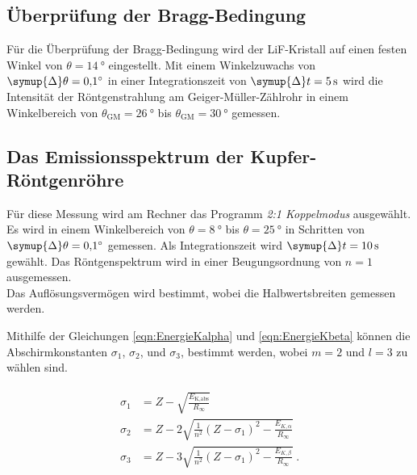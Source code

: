 \subsection{Überprüfung der Bragg-Bedingung}

    Für die Überprüfung der Bragg-Bedingung wird der LiF-Kristall auf einen festen Winkel von $\theta = \SI{14}{\degree}$ eingestellt.
    Mit einem Winkelzuwachs von $\symup{\Delta}\theta = \SI{0.1}{\degree}$ in einer Integrationszeit von $\symup{\Delta}t = \SI{5}{\second}$
    wird die Intensität der Röntgenstrahlung am Geiger-Müller-Zählrohr in einem Winkelbereich von $\theta_\text{GM} = \SI{26}{\degree}$
    bis $\theta_\text{GM} = \SI{30}{\degree}$ gemessen.


\subsection{Das Emissionsspektrum der Kupfer-Röntgenröhre}

    Für diese Messung wird am Rechner das Programm \textit{2:1 Koppelmodus} ausgewählt.
    Es wird in einem Winkelbereich von $\theta = \SI{8}{\degree}$ bis $\theta = \SI{25}{\degree}$ in Schritten von $\symup{\Delta}\theta = \SI{0.1}{\degree}$ gemessen.
    Als Integrationszeit wird $\symup{\Delta}t = \SI{10}{\second}$ gewählt.
    Das Röntgenspektrum wird in einer Beugungsordnung von $n=1$ ausgemessen.
    \\
    Das Auflösungsvermögen wird
    bestimmt,
    wobei die Halbwertsbreiten gemessen werden.

    Mithilfe der Gleichungen \eqref{eqn:EnergieKalpha} und \eqref{eqn:EnergieKbeta} können die Abschirmkonstanten $\sigma_1$, $\sigma_2$, und $\sigma_3$, bestimmt werden,
    wobei $m=2$ und $l=3$ zu wählen sind.

    \begin{align}
    \begin{split}
        \label{eqn:sigma_123}
        \sigma_1 &= Z - \sqrt{\frac{E_\text{K,abs}}{R_\infty}} \\
        \sigma_2 &= Z - 2 \sqrt{\frac{1}{n^2} (Z - \sigma_1)^2-\frac{E_{K,\alpha}}{R_\infty}} \\
        \sigma_3 &= Z - 3 \sqrt{\frac{1}{n^2} (Z - \sigma_1)^2-\frac{E_{K,\beta}}{R_\infty}} \; .
    \end{split}
    \end{align}


